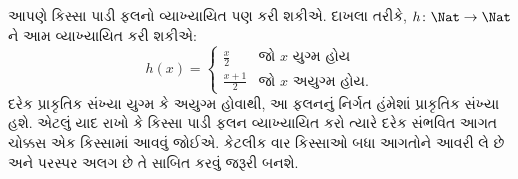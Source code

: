 \documentclass[../../../include/open-logic-section]{subfiles}
\begin{document}
\begin{ex}
આપણે કિસ્સા પાડી ફલનો વ્યાખ્યાયિત પણ કરી શકીએ.
દાખલા તરીકે, $h \colon \Nat \to \Nat$ને આમ વ્યાખ્યાયિત
કરી શકીએ:
\[
h(x) =
\begin{cases}
  \frac{x}{2} & \text{જો $x$ યુગ્મ હોય} \\
  \frac{x+1}{2} & \text{જો $x$ અયુગ્મ હોય.}
\end{cases}
\]
દરેક પ્રાકૃતિક સંખ્યા યુગ્મ કે અયુગ્મ હોવાથી, આ ફલનનું
નિર્ગત હંમેશાં પ્રાકૃતિક સંખ્યા હશે. એટલું યાદ રાખો કે
કિસ્સા પાડી ફલન વ્યાખ્યાયિત કરો ત્યારે દરેક સંભવિત
આગત ચોક્કસ એક કિસ્સામાં આવવું જોઈએ. કેટલીક વાર
કિસ્સાઓ બધા આગતોને આવરી લે છે અને પરસ્પર અલગ છે
તે સાબિત કરવું જરૂરી બનશે.
\end{ex}
\end{document}
